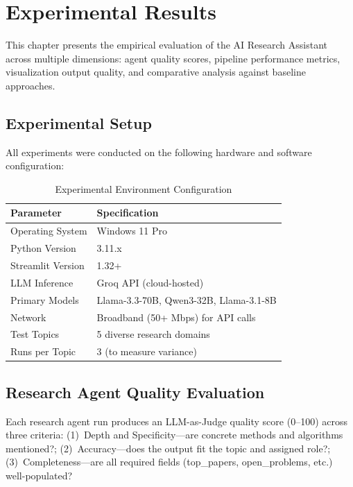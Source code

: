 \chapter{Experimental Results}

This chapter presents the empirical evaluation of the AI Research Assistant across multiple dimensions: agent quality scores, pipeline performance metrics, visualization output quality, and comparative analysis against baseline approaches.

\section{Experimental Setup}

All experiments were conducted on the following hardware and software configuration:

\begin{table}[H]
\centering
\caption{Experimental Environment Configuration}
\label{tab:exp_setup}
\begin{tabularx}{\textwidth}{|l|X|}
\hline
\textbf{Parameter} & \textbf{Specification} \\
\hline
Operating System & Windows 11 Pro \\
\hline
Python Version & 3.11.x \\
\hline
Streamlit Version & 1.32+ \\
\hline
LLM Inference & Groq API (cloud-hosted) \\
\hline
Primary Models & Llama-3.3-70B, Qwen3-32B, Llama-3.1-8B \\
\hline
Network & Broadband (50+ Mbps) for API calls \\
\hline
Test Topics & 5 diverse research domains \\
\hline
Runs per Topic & 3 (to measure variance) \\
\hline
\end{tabularx}
\end{table}

\section{Research Agent Quality Evaluation}

Each research agent run produces an LLM-as-Judge quality score (0--100) across three criteria: (1)~Depth and Specificity---are concrete methods and algorithms mentioned?; (2)~Accuracy---does the output fit the topic and assigned role?; (3)~Completeness---are all required fields (top\_papers, open\_problems, etc.) well-populated?

